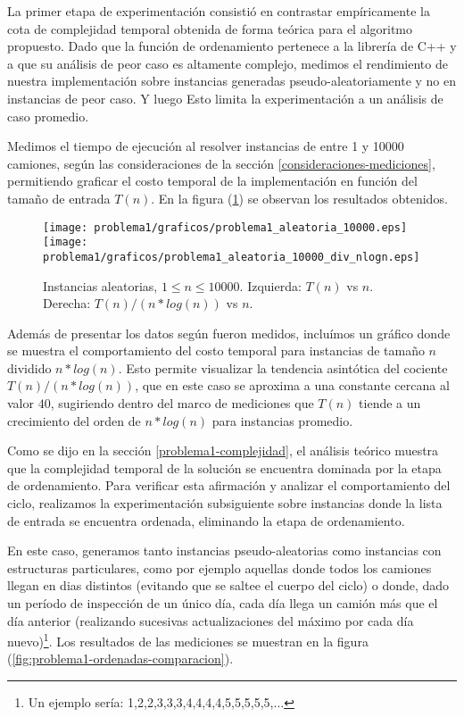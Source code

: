 La primer etapa de experimentación consistió en contrastar empíricamente la cota de complejidad temporal obtenida de forma teórica para el algoritmo propuesto. Dado que la función de ordenamiento pertenece a la librería de C++ y a que su análisis de peor caso es altamente complejo, medimos el rendimiento de nuestra implementación sobre instancias generadas pseudo-aleatoriamente y no en instancias de peor caso. Y luego Esto limita la experimentación a un análisis de caso promedio.

Medimos el tiempo de ejecución al resolver instancias de entre 1 y 10000 camiones, según las consideraciones de la sección \ref{consideraciones-mediciones}, permitiendo graficar el costo temporal de la implementación en función del tamaño de entrada $T(n)$. En la figura (\ref{fig:problema1-aleatoria-10000}) se observan los resultados obtenidos.

\begin{center}
  \begin{figure}[H]
    \texttt{[image: problema1/graficos/problema1\_aleatoria\_10000.eps]}
    \texttt{[image: problema1/graficos/problema1\_aleatoria\_10000\_div\_nlogn.eps]}
    \caption{Instancias aleatorias, $1 \leq n \leq 10000$. Izquierda: $T(n)$ vs $n$. Derecha: $T(n) / (n * log(n))$ vs $n$.}
    \label{fig:problema1-aleatoria-10000}
  \end{figure}
\end{center}

Además de presentar los datos según fueron medidos, incluímos un gráfico donde se muestra el comportamiento del costo temporal para instancias de tamaño $n$ dividido $n * log(n)$. Esto permite visualizar la tendencia asintótica del cociente $T(n) / (n * log(n))$, que en este caso se aproxima a una constante cercana al valor $40$, sugiriendo dentro del marco de mediciones que $T(n)$ tiende a un crecimiento del orden de $n * log(n)$ para instancias promedio.

Como se dijo en la sección \ref{problema1-complejidad}, el análisis teórico muestra que la complejidad temporal de la solución se encuentra dominada por la etapa de ordenamiento. Para verificar esta afirmación y analizar el comportamiento del ciclo, realizamos la experimentación subsiguiente sobre instancias donde la lista de entrada se encuentra ordenada, eliminando la etapa de ordenamiento.

En este caso, generamos tanto instancias pseudo-aleatorias como instancias con estructuras particulares, como por ejemplo aquellas donde todos los camiones llegan en dias distintos (evitando que se saltee el cuerpo del ciclo) o donde, dado un período de inspección de un único día, cada día llega un camión más que el día anterior (realizando sucesivas actualizaciones del máximo por cada día nuevo)\footnote{Un ejemplo sería: 1,2,2,3,3,3,4,4,4,4,5,5,5,5,5,...}. Los resultados de las mediciones se muestran en la figura (\ref{fig:problema1-ordenadas-comparacion}).

